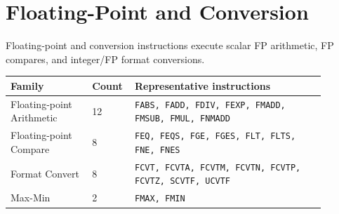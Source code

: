 \section{Floating-Point and Conversion}
Floating-point and conversion instructions execute scalar FP arithmetic, FP compares, and integer/FP format conversions.\par\smallskip
{\scriptsize
\begin{longtable}{@{}L{0.24\linewidth}R{0.09\linewidth}L{0.56\linewidth}@{}}
\toprule
Family & Count & Representative instructions \\
\midrule
Floating-point Arithmetic & 12 & \texttt{FABS, FADD, FDIV, FEXP, FMADD, FMSUB, FMUL, FNMADD} \\
Floating-point Compare & 8 & \texttt{FEQ, FEQS, FGE, FGES, FLT, FLTS, FNE, FNES} \\
Format Convert & 8 & \texttt{FCVT, FCVTA, FCVTM, FCVTN, FCVTP, FCVTZ, SCVTF, UCVTF} \\
Max-Min & 2 & \texttt{FMAX, FMIN} \\
\bottomrule
\end{longtable}
}


\medskip

\medskip

\medskip

\medskip

\medskip

\medskip

\medskip

\medskip

\medskip

\medskip

\medskip

\medskip

\medskip

\medskip

\medskip

\medskip

\medskip

\medskip

\medskip

\medskip

\medskip

\medskip

\medskip

\medskip

\medskip

\medskip

\medskip

\medskip

\medskip

\medskip


